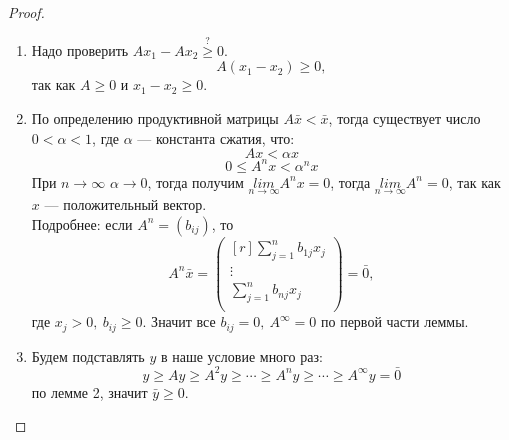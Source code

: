\documentclass[12pt]{article}
\begin{document}
	\begin{proof}
		\ 
		\begin{enumerate}
			\item Надо проверить $Ax_1-Ax_2 \overset{?}{\geqslant} 0$.\\
			$$A(x_1-x_2)\geqslant 0,$$
			так как $A\geqslant 0$ и $x_1-x_2 \geqslant 0.$
			\item По определению продуктивной матрицы $A\bar x< \bar x$, тогда существует число $0<\alpha <1$, где $\alpha$ --- константа сжатия, что:
			$$Ax<\alpha x$$
			$$0\leqslant A^n x<\alpha^n x$$
			При $n\to \infty$ $\alpha \to 0$, тогда получим $\underset{n\to \infty}{lim}A^nx=0$, тогда $\underset{n\to \infty}{lim}A^n=0$, так как $x$ --- положительный вектор.\\
			Подробнее: если $A^n=(b_{ij})$, то 
			\[A^n \bar x = \begin{pmatrix}[r]
			\sum\limits_{j=1}^n b_{1j}x_j\\
			\vdots\\
			\sum\limits_{j=1}^n b_{nj}x_j\\
			\end{pmatrix}=\bar 0,\]
			где $x_j>0,~ b_{ij}\geqslant 0$. Значит все $b_{ij}=0,~A^{\infty}=0$ по первой части леммы.
			\item Будем подставлять $y$ в наше условие много раз: $$y\geqslant Ay \geqslant A^2y \geqslant \cdots \geqslant A^n y \geqslant \cdots \geqslant A^{\infty} y =\bar 0$$ по лемме 2, значит $\bar y \geqslant 0.$
		\end{enumerate}
	\end{proof}
\end{document}
